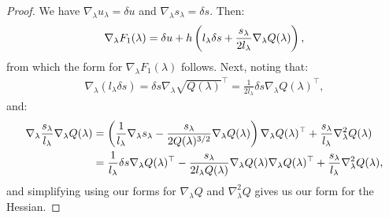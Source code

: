 \documentclass[eikonal.tex]{subfiles}
\begin{document}
\begin{proof}
  We have $\nabla_\lambda u_\lambda = \delta u$ and
  $\nabla_\lambda s_\lambda = \delta s$. Then:
  \begin{align*}
    \nabla_\lambda F_1(\lambda) = \delta u + h \left(l_\lambda \delta s + \frac{s_\lambda}{2 l_\lambda} \nabla_\lambda Q(\lambda)\right),
  \end{align*}
  from which the form for $\nabla_\lambda F_1(\lambda)$ follows. Next,
  noting that:
  \begin{align*}
    \nabla_\lambda (l_\lambda \delta s) = \delta s \nabla_\lambda \sqrt{Q(\lambda)}^\top = \frac{1}{2l_\lambda} \delta s \nabla_\lambda Q(\lambda)^\top,
  \end{align*}
  and:
  \begin{align*}
    \nabla_\lambda \frac{s_\lambda}{l_\lambda} \nabla_\lambda Q(\lambda)
    &= \left(\frac{1}{l_\lambda} \nabla_\lambda s_\lambda - \frac{s_\lambda}{2 Q(\lambda)^{3/2}} \nabla_\lambda Q(\lambda)\right) \nabla_\lambda Q(\lambda)^\top + \frac{s_\lambda}{l_\lambda} \nabla^2_\lambda Q(\lambda) \\
    &= \frac{1}{l_\lambda} \delta s \nabla_\lambda Q(\lambda)^\top - \frac{s_\lambda}{2 l_\lambda Q(\lambda)} \nabla_\lambda Q(\lambda) \nabla_\lambda Q(\lambda)^\top + \frac{s_\lambda}{l_\lambda} \nabla_\lambda^2 Q(\lambda),
  \end{align*}
  and simplifying using our forms for $\nabla_\lambda Q$ and
  $\nabla_\lambda^2 Q$ gives us our form for the Hessian.
\end{proof}
\end{document}
